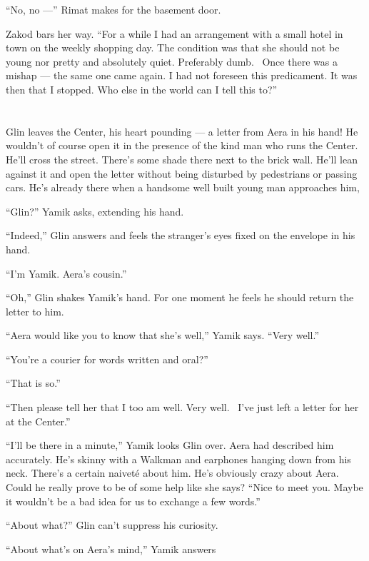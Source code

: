 \documentclass[twoside,11pt]{book}
\begin{document}
``No, no ---'' Rimat makes for the basement door.

Zakod bars her way. ``For a while I had an arrangement with a small hotel in town on the weekly shopping
day. The condition was that she should not be young nor pretty and absolutely quiet. Preferably dumb. ~Once there was a
mishap --- the same one came again. I had not foreseen this predicament. It was then that I stopped. Who else in the
world can I tell this to?''



\chapter{}

Glin leaves the Center, his heart pounding --- a letter from Aera in his hand! He wouldn't of course open it in the
presence of the kind man who runs the Center. He'll cross the street. There's some shade there next to the brick wall.
He'll lean against it and open the letter without being disturbed by pedestrians or passing cars. He's already there
when a handsome well built young man approaches him,

``Glin?'' Yamik asks, extending his hand.

``Indeed,'' Glin answers and feels the stranger's eyes fixed on the envelope in his hand.

``I'm Yamik. Aera's cousin.''

``Oh,'' Glin shakes Yamik's hand. For one moment he feels he should return the letter to him.


``Aera would like you to know that she's well,'' Yamik says. ``Very
well.''

``You're a courier for words written and oral?''

``That is so.''

``Then please tell her that I too am well. Very well.~ I've just left a letter for her at the
Center.''

``I'll be there in a minute,'' Yamik looks Glin over. Aera had described him accurately. He's
skinny with a Walkman and earphones hanging down from his neck. There's a certain naivet\'e about him. He's obviously
crazy about Aera. Could he really prove to be of some help like she says? ``Nice to meet you. Maybe it
wouldn't be a bad idea for us to exchange a few words.''

``About what?'' Glin can't suppress his curiosity.

``About what's on Aera's mind,'' Yamik answers
\end{document}
